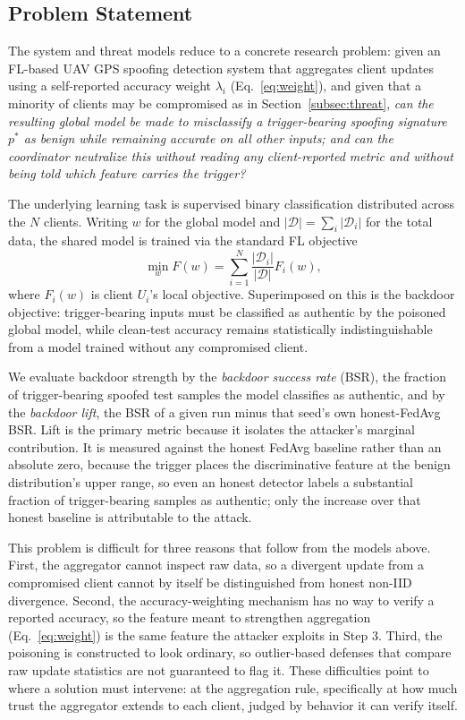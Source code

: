 \documentclass[journal]{IEEEtran}
\begin{document}
\subsection{Problem Statement}
The system and threat models reduce to a concrete research problem: given an FL-based UAV GPS spoofing detection system that aggregates client updates using a self-reported accuracy weight $\lambda_i$ (Eq.~\ref{eq:weight}), and given that a minority of clients may be compromised as in Section~\ref{subsec:threat}, \emph{can the resulting global model be made to misclassify a trigger-bearing spoofing signature $p^{*}$ as benign while remaining accurate on all other inputs; and can the coordinator neutralize this without reading any client-reported metric and without being told which feature carries the trigger?}

The underlying learning task is supervised binary classification distributed across the $N$ clients. Writing $w$ for the global model and $|\mathcal{D}| = \sum_{i}|\mathcal{D}_i|$ for the total data, the shared model is trained via the standard FL objective
\begin{equation}
\min_{w} F(w) = \sum_{i=1}^{N} \frac{|\mathcal{D}_i|}{|\mathcal{D}|} F_i(w),
\label{eq:fl_objective}
\end{equation}
where $F_i(w)$ is client $U_i$'s local objective. Superimposed on this is the backdoor objective: trigger-bearing inputs must be classified as authentic by the poisoned global model, while clean-test accuracy remains statistically indistinguishable from a model trained without any compromised client.

We evaluate backdoor strength by the \emph{backdoor success rate} (BSR), the fraction of trigger-bearing spoofed test samples the model classifies as authentic, and by the \emph{backdoor lift}, the BSR of a given run minus that seed's own honest-FedAvg BSR. Lift is the primary metric because it isolates the attacker's marginal contribution. It is measured against the honest FedAvg baseline rather than an absolute zero, because the trigger places the discriminative feature at the benign distribution's upper range, so even an honest detector labels a substantial fraction of trigger-bearing samples as authentic; only the increase over that honest baseline is attributable to the attack.

This problem is difficult for three reasons that follow from the models above. First, the aggregator cannot inspect raw data, so a divergent update from a compromised client cannot by itself be distinguished from honest non-IID divergence. Second, the accuracy-weighting mechanism has no way to verify a reported accuracy, so the feature meant to strengthen aggregation (Eq.~\ref{eq:weight}) is the same feature the attacker exploits in Step 3. Third, the poisoning is constructed to look ordinary, so outlier-based defenses that compare raw update statistics are not guaranteed to flag it. These difficulties point to where a solution must intervene: at the aggregation rule, specifically at how much trust the aggregator extends to each client, judged by behavior it can verify itself.
\end{document}
